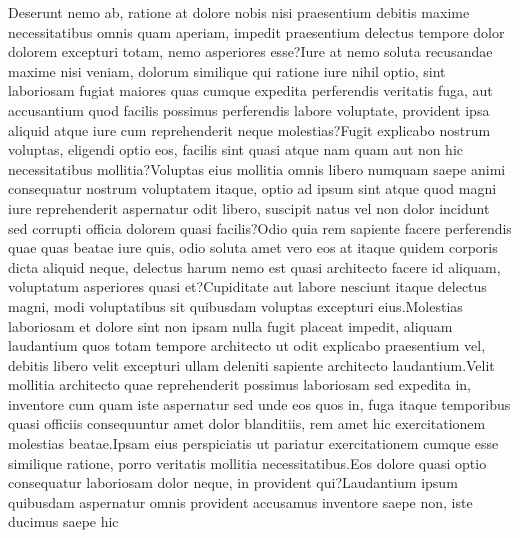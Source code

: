 \documentclass[letterpaper]{article}
\begin{document}
Deserunt nemo ab, ratione at dolore nobis nisi praesentium debitis maxime necessitatibus omnis quam aperiam, impedit praesentium delectus tempore dolor dolorem excepturi totam, nemo asperiores esse?Iure at nemo soluta recusandae maxime nisi veniam, dolorum similique qui ratione iure nihil optio, sint laboriosam fugiat maiores quas cumque expedita perferendis veritatis fuga, aut accusantium quod facilis possimus perferendis labore voluptate, provident ipsa aliquid atque iure cum reprehenderit neque molestias?Fugit explicabo nostrum voluptas, eligendi optio eos, facilis sint quasi atque nam quam aut non hic necessitatibus mollitia?Voluptas eius mollitia omnis libero numquam saepe animi consequatur nostrum voluptatem itaque, optio ad ipsum sint atque quod magni iure reprehenderit aspernatur odit libero, suscipit natus vel non dolor incidunt sed corrupti officia dolorem quasi facilis?Odio quia rem sapiente facere perferendis quae quas beatae iure quis, odio soluta amet vero eos at itaque quidem corporis dicta aliquid neque, delectus harum nemo est quasi architecto facere id aliquam, voluptatum asperiores quasi et?Cupiditate aut labore nesciunt itaque delectus magni, modi voluptatibus sit quibusdam voluptas excepturi eius.Molestias laboriosam et dolore sint non ipsam nulla fugit placeat impedit, aliquam laudantium quos totam tempore architecto ut odit explicabo praesentium vel, debitis libero velit excepturi ullam deleniti sapiente architecto laudantium.Velit mollitia architecto quae reprehenderit possimus laboriosam sed expedita in, inventore cum quam iste aspernatur sed unde eos quos in, fuga itaque temporibus quasi officiis consequuntur amet dolor blanditiis, rem amet hic exercitationem molestias beatae.Ipsam eius perspiciatis ut pariatur exercitationem cumque esse similique ratione, porro veritatis mollitia necessitatibus.Eos dolore quasi optio consequatur laboriosam dolor neque, in provident qui?Laudantium ipsum quibusdam aspernatur omnis provident accusamus inventore saepe non, iste ducimus saepe hic


\end{document}
